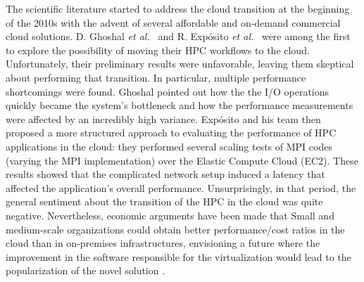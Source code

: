 The scientific literature started to address the cloud transition at the
beginning of the 2010s with the advent of several affordable and on-demand
commercial cloud solutions. D. Ghoshal \emph{et al.}~\cite{Ghoshal2011} and  R.
Exp\'osito \emph{et al.}~\cite{exposito2013} were among the first to explore the
possibility of moving their HPC workflows to the cloud. Unfortunately, their
preliminary results were unfavorable, leaving them skeptical about performing
that transition. In particular, multiple performance shortcomings were found.
Ghoshal pointed out how the the I/O operations quickly became the system's
bottleneck and how the performance measurements were affected by an incredibly
high variance. Exp\'osito and his team then proposed a more structured approach
to evaluating the performance of HPC applications in the cloud: they performed
several scaling tests of MPI codes (varying the MPI implementation) over the
Elastic Compute Cloud (EC2). These results showed that the complicated network
setup induced a latency that affected the application's overall performance.
Unsurprisingly, in that period, the general sentiment about the transition of
the HPC in the cloud was quite negative. Nevertheless, economic arguments have
been made that Small and medium-scale organizations could obtain better
performance/cost ratios in the cloud than in on-premises infrastructures,
envisioning a future where the improvement in the software responsible for the
virtualization would lead to the popularization of the novel solution
\cite{Gupta2013}.



